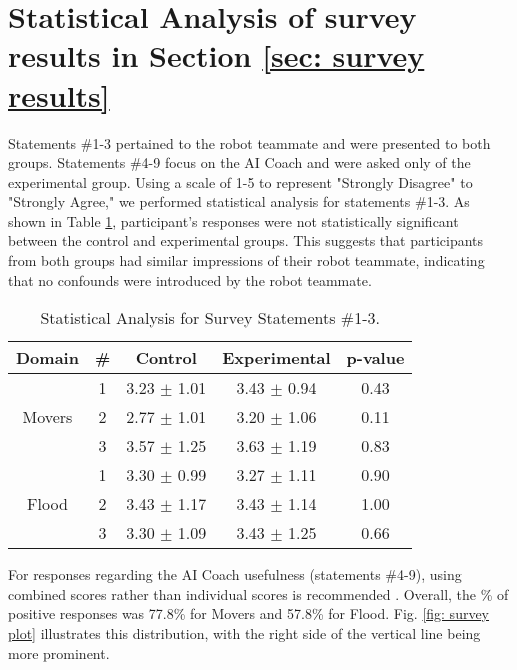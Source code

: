 \section{Statistical Analysis of survey results in Section \ref{sec: survey results}}

Statements \#1-3 pertained to the robot teammate and were presented to both groups. Statements \#4-9 focus on the AI Coach and were asked only of the experimental group.
Using a scale of 1-5 to represent "Strongly Disagree" to "Strongly Agree," we performed statistical analysis for statements \#1-3. As shown in Table \ref{table: survey stats}, participant's responses were not statistically significant between the control and experimental groups. This suggests that participants from both groups had similar impressions of their robot teammate, indicating that no confounds were introduced by the robot teammate.

\begin{table}[h]
    \caption{Statistical Analysis for Survey Statements \#1-3.}
    \label{table: survey stats}
    \centering
    \begin{tabular}{c c c c c}
        \toprule
        \textbf{Domain} & \# & \textbf{Control} & \textbf{Experimental} & \textbf{p-value} \\
        \midrule
        \multirow{3}{*}{Movers} 
         & 1 & 3.23 $\pm$ 1.01 & 3.43 $\pm$ 0.94 & 0.43 \\
         & 2 & 2.77 $\pm$ 1.01 & 3.20 $\pm$ 1.06 & 0.11 \\
         & 3 & 3.57 $\pm$ 1.25 & 3.63 $\pm$ 1.19 & 0.83 \\
        \midrule
        \multirow{3}{*}{Flood} 
         & 1 & 3.30 $\pm$ 0.99 & 3.27 $\pm$ 1.11 & 0.90 \\
         & 2 & 3.43 $\pm$ 1.17 & 3.43 $\pm$ 1.14 & 1.00 \\
         & 3 & 3.30 $\pm$ 1.09 & 3.43 $\pm$ 1.25 & 0.66 \\
        \bottomrule
    \end{tabular}
\end{table}

For responses regarding the AI Coach usefulness (statements \#4-9), using combined scores rather than individual scores is recommended \cite{schrum2020four}. Overall, the \% of positive responses was 77.8\% for Movers and 57.8\% for Flood. Fig. \ref{fig: survey plot} illustrates this distribution, with the right side of the vertical line being more prominent. 

